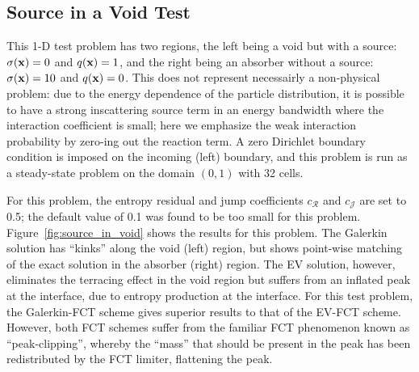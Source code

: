 \subsection{Source in a Void Test}
This 1-D test problem has two regions, the left being a void but with a source:
$\sigma(\mathbf{x})=0$ and $q(\mathbf{x})=1$, and the right being an absorber without a source:
$\sigma(\mathbf{x})=10$ and $q(\mathbf{x})=0$. This does not represent necessairly a non-physical problem:
due to the energy dependence of the particle distribution, it is possible to have
a strong inscattering source term in an energy bandwidth where the interaction coefficient is
small; here we emphasize the weak interaction probability by zero-ing out the reaction term.
A zero Dirichlet boundary condition is imposed on the incoming (left)
boundary, and this problem is run as a steady-state problem on the domain
$(0,1)$ with 32 cells.

For this problem, the entropy residual and jump coefficients $c_\mathcal{R}$
and $c_\mathcal{J}$ are set to 0.5; the default value of 0.1 was found
to be too small for this problem.
Figure~\ref{fig:source_in_void} shows the results for this problem.
The Galerkin solution has ``kinks'' along the void (left) region, but
shows point-wise matching of the exact solution in the absorber (right)
region. The EV solution, however, eliminates the terracing effect in
the void region but suffers from an inflated peak at the interface, due
to entropy production at the interface. For this test problem, the
Galerkin-FCT scheme gives superior results to that of the EV-FCT
scheme. However, both FCT schemes suffer from the familiar FCT
phenomenon known as ``peak-clipping'', whereby the ``mass'' that
should be present in the peak has been redistributed by the FCT
limiter, flattening the peak.

